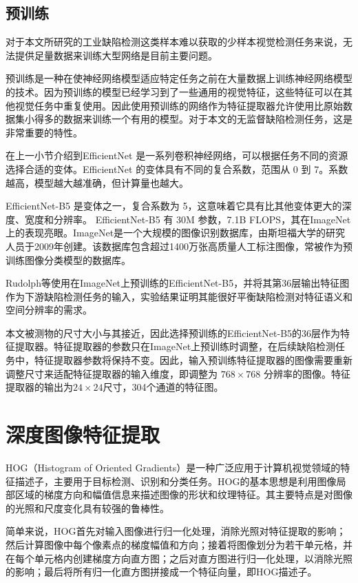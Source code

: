 \subsection{预训练}
对于本文所研究的工业缺陷检测这类样本难以获取的少样本视觉检测任务来说，无法提供足量数据来训练大型网络是目前主要问题。

预训练是一种在使神经网络模型适应特定任务之前在大量数据上训练神经网络模型的技术。因为预训练的模型已经学习到了一些通用的视觉特征，这些特征可以在其他视觉任务中重复使用。因此使用预训练的网络作为特征提取器允许使用比原始数据集小得多的数据来训练一个有用的模型。对于本文的无监督缺陷检测任务，这是非常重要的特性。

在上一小节介绍到EfficientNet 是一系列卷积神经网络，可以根据任务不同的资源选择合适的变体。EfficientNet 的变体具有不同的复合系数，范围从 0 到 7。系数越高，模型越大越准确，但计算量也越大。

EfficientNet-B5 是变体之一，复合系数为 5，这意味着它具有比其他变体更大的深度、宽度和分辨率。 EfficientNet-B5 有 30M 参数，7.1B FLOPS，其在ImageNet上的表现亮眼。ImageNet是一个大规模的图像识别数据库，由斯坦福大学的研究人员于2009年创建。该数据库包含超过1400万张高质量人工标注图像，常被作为预训练图像分类模型的数据库。

Rudolph等\cite{rudolphAsymmetricStudentTeacherNetworks2022}使用在ImageNet上预训练的EfficientNet-B5，并将其第36层输出特征图作为下游缺陷检测任务的输入，实验结果证明其能很好平衡缺陷检测对特征语义和空间分辨率的需求。

本文被测物的尺寸大小与其接近，因此选择预训练的EfficientNet-B5的36层作为特征提取器。特征提取器的参数只在ImageNet上预训练时调整，在后续缺陷检测任务中，特征提取器参数将保持不变。因此，输入预训练特征提取器的图像需要重新调整尺寸来适配特征提取器的输入维度，即调整为 $768 \times 768$ 分辨率的图像。特征提取器的输出为$24 \times 24$尺寸，304个通道的特征图。

\section{深度图像特征提取}
HOG（Histogram of Oriented Gradients）是一种广泛应用于计算机视觉领域的特征描述子，主要用于目标检测、识别和分类任务。HOG的基本思想是利用图像局部区域的梯度方向和幅值信息来描述图像的形状和纹理特征。其主要特点是对图像的光照和尺度变化具有较强的鲁棒性。

简单来说，HOG首先对输入图像进行归一化处理，消除光照对特征提取的影响；然后计算图像中每个像素点的梯度幅值和方向；接着将图像划分为若干单元格，并在每个单元格内创建梯度方向直方图；之后对直方图进行归一化处理，以消除光照的影响；最后将所有归一化直方图拼接成一个特征向量，即HOG描述子。

